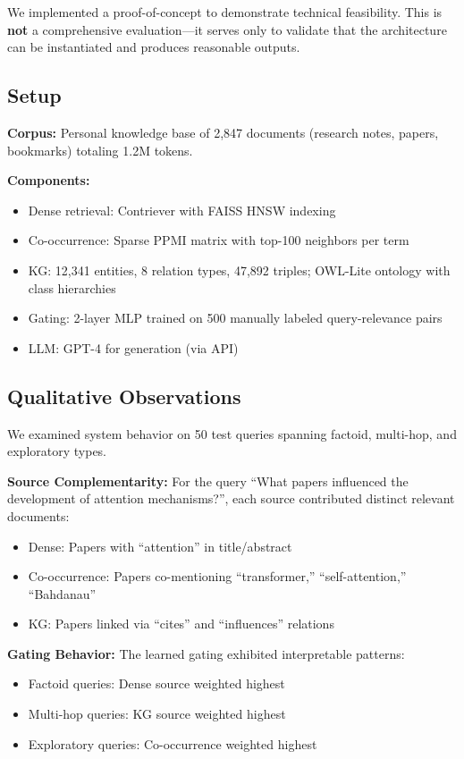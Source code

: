\documentclass[11pt,a4paper]{article}
\begin{document}
We implemented a proof-of-concept to demonstrate technical feasibility. This is \textbf{not} a comprehensive evaluation---it serves only to validate that the architecture can be instantiated and produces reasonable outputs.

\subsection{Setup}

\textbf{Corpus:} Personal knowledge base of 2,847 documents (research notes, papers, bookmarks) totaling 1.2M tokens.

\textbf{Components:}
\begin{itemize}
    \item Dense retrieval: Contriever with FAISS HNSW indexing
    \item Co-occurrence: Sparse PPMI matrix with top-100 neighbors per term
    \item KG: 12,341 entities, 8 relation types, 47,892 triples; OWL-Lite ontology with class hierarchies
    \item Gating: 2-layer MLP trained on 500 manually labeled query-relevance pairs
    \item LLM: GPT-4 for generation (via API)
\end{itemize}

\subsection{Qualitative Observations}

We examined system behavior on 50 test queries spanning factoid, multi-hop, and exploratory types.

\textbf{Source Complementarity:} For the query ``What papers influenced the development of attention mechanisms?'', each source contributed distinct relevant documents:
\begin{itemize}
    \item Dense: Papers with ``attention'' in title/abstract
    \item Co-occurrence: Papers co-mentioning ``transformer,'' ``self-attention,'' ``Bahdanau''
    \item KG: Papers linked via ``cites'' and ``influences'' relations
\end{itemize}

\textbf{Gating Behavior:} The learned gating exhibited interpretable patterns:
\begin{itemize}
    \item Factoid queries: Dense source weighted highest
    \item Multi-hop queries: KG source weighted highest
    \item Exploratory queries: Co-occurrence weighted highest
\end{itemize}
\end{document}
